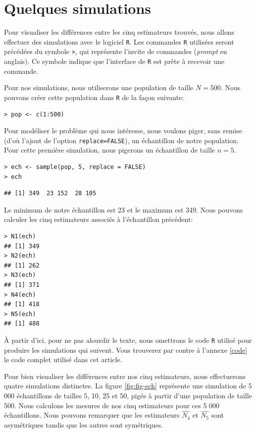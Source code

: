 \documentclass[10pt]{article}
\begin{document}
\hypertarget{quelques-simulations}{%
\section{\texorpdfstring{Quelques simulations
\label{simul}}{Quelques simulations }}\label{quelques-simulations}}

Pour visualiser les différences entre les cinq estimateurs trouvés, nous
allons effectuer des simulations avec le logiciel \texttt{R}. Les
commandes \texttt{R} utilisées seront précédées du symbole
\texttt{\textgreater{}}, qui représente l'invite de commandes
(\emph{prompt} en anglais). Ce symbole indique que l'interface de
\texttt{R} est prête à recevoir une commande.

Pour nos simulations, nous utiliserons une population de taille
\(N=500\). Nous pouvons créer cette population dans \texttt{R} de la
façon suivante:

\begin{verbatim}
> pop <- c(1:500)
\end{verbatim}

Pour modéliser le problème qui nous intéresse, nous voulons piger, sans
remise (d'où l'ajout de l'option \texttt{replace=FALSE}), un échantillon
de notre population. Pour cette première simulation, nous pigerons un
échantillon de taille \(n=5\).

\begin{verbatim}
> ech <- sample(pop, 5, replace = FALSE)
> ech
\end{verbatim}

\begin{verbatim}
## [1] 349  23 152  28 105
\end{verbatim}

Le minimum de notre échantillon est 23 et le maximum est 349. Nous
pouvons calculer les cinq estimateurs associés à l'échantillon
précédent:

\begin{verbatim}
> N1(ech)
## [1] 349
> N2(ech)
## [1] 262
> N3(ech)
## [1] 371
> N4(ech)
## [1] 418
> N5(ech)
## [1] 488
\end{verbatim}

À partir d'ici, pour ne pas alourdir le texte, nous omettrons le code
\texttt{R} utilisé pour produire les simulations qui suivent. Vous
trouverez par contre à l'annexe \ref{code} le code complet utilisé dans
cet article.

Pour bien visualiser les différences entre nos cinq estimateurs, nous
effectuerons quatre simulations distinctes. La figure \ref{fig:fig-ech}
représente une simulation de 5 000 échantillons de tailles 5, 10, 25 et
50, pigés à partir d'une population de taille 500. Nous calculons les
mesures de nos cinq estimateurs pour ces 5 000 échantillons. Nous
pouvons remarquer que les estimateurs \(\widehat{N_4}\) et
\(\widehat{N_5}\) sont asymétriques tandis que les autres sont
symétriques.
\end{document}
